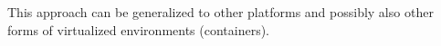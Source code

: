 This approach can be generalized to other platforms and possibly also
other forms of virtualized environments (containers).

















%
%


